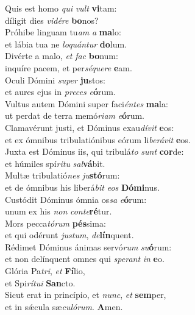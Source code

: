 \evenverse Quis est homo \textit{qui} \textit{vult} \textbf{vi}tam:~\*\\
\evenverse díligit dies \textit{vi}\textit{dé}\textit{re} \textbf{bo}nos?\\
\oddverse Próhibe linguam tu\textit{am} \textit{a} \textbf{ma}lo:~\*\\
\oddverse et lábia tua ne \textit{lo}\textit{quán}\textit{tur} \textbf{do}lum.\\
\evenverse Divérte a malo, \textit{et} \textit{fac} \textbf{bo}num:~\*\\
\evenverse inquíre pacem, et per\textit{sé}\textit{que}\textit{re} \textbf{e}am.\\
\oddverse Oculi Dómini \textit{su}\textit{per} \textbf{ju}stos:~\*\\
\oddverse et aures ejus in \textit{pre}\textit{ces} \textit{e}\textbf{ó}rum.\\
\evenverse Vultus autem Dómini super faci\textit{én}\textit{tes} \textbf{ma}la:~\*\\
\evenverse ut perdat de terra memó\textit{ri}\textit{am} \textit{e}\textbf{ó}rum.\\
\oddverse Clamavérunt justi, et Dóminus exau\textit{dí}\textit{vit} \textbf{e}os:~\*\\
\oddverse et ex ómnibus tribulatiónibus eórum li\textit{be}\textit{rá}\textit{vit} \textbf{e}os.\\
\evenverse Juxta est Dóminus iis, qui tribulá\textit{to} \textit{sunt} \textbf{cor}de:~\*\\
\evenverse et húmiles spí\textit{ri}\textit{tu} \textit{sal}\textbf{vá}bit.\\
\oddverse Multæ tribulatió\textit{nes} \textit{ju}\textbf{stó}rum:~\*\\
\oddverse et de ómnibus his liberá\textit{bit} \textit{e}\textit{os} \textbf{Dó}\textbf{mi}nus.\\
\evenverse Custódit Dóminus ómnia os\textit{sa} \textit{e}\textbf{ó}rum:~\*\\
\evenverse unum ex his \textit{non} \textit{con}\textit{te}\textbf{ré}tur.\\
\oddverse Mors pecca\textit{tó}\textit{rum} \textbf{pés}sima:~\*\\
\oddverse et qui odérunt \textit{ju}\textit{stum}, \textit{de}\textbf{lín}quent.\\
\evenverse Rédimet Dóminus ánimas servó\textit{rum} \textit{su}\textbf{ó}rum:~\*\\
\evenverse et non delínquent omnes qui \textit{spe}\textit{rant} \textit{in} \textbf{e}o.\\
\oddverse Glória Pa\textit{tri}, \textit{et} \textbf{Fí}lio,~\*\\
\oddverse et Spi\textit{rí}\textit{tu}\textit{i} \textbf{San}cto.\\
\evenverse Sicut erat in princípio, et \textit{nunc}, \textit{et} \textbf{sem}per,~\*\\
\evenverse et in sǽcula sæ\textit{cu}\textit{ló}\textit{rum}. \textbf{A}men.\\
